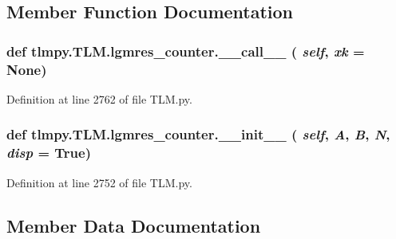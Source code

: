 \subsection{Member Function Documentation}
\hypertarget{classtlmpy_1_1TLM_1_1lgmres__counter_ab297b26909720fcbd8fea5479de5c8af}{
\subsubsection[{\_\-\_\-call\_\-\_\-}]{\setlength{\rightskip}{0pt plus 5cm}def tlmpy.TLM.lgmres\_\-counter.\_\-\_\-call\_\-\_\- ( {\em self}, \/   {\em xk} = {\ttfamily None})}}
\label{classtlmpy_1_1TLM_1_1lgmres__counter_ab297b26909720fcbd8fea5479de5c8af}


Definition at line 2762 of file TLM.py.\hypertarget{classtlmpy_1_1TLM_1_1lgmres__counter_a3445cbd6d607d4b2825854d2ecc30898}{
\subsubsection[{\_\-\_\-init\_\-\_\-}]{\setlength{\rightskip}{0pt plus 5cm}def tlmpy.TLM.lgmres\_\-counter.\_\-\_\-init\_\-\_\- ( {\em self}, \/   {\em A}, \/   {\em B}, \/   {\em N}, \/   {\em disp} = {\ttfamily True})}}
\label{classtlmpy_1_1TLM_1_1lgmres__counter_a3445cbd6d607d4b2825854d2ecc30898}


Definition at line 2752 of file TLM.py.

\subsection{Member Data Documentation}
\hypertarget{classtlmpy_1_1TLM_1_1lgmres__counter_adb46fedc179a74185b3eaae0af1f16d6}{
\subsubsection[{A}]{}}
\label{classtlmpy_1_1TLM_1_1lgmres__counter_adb46fedc179a74185b3eaae0af1f16d6}


